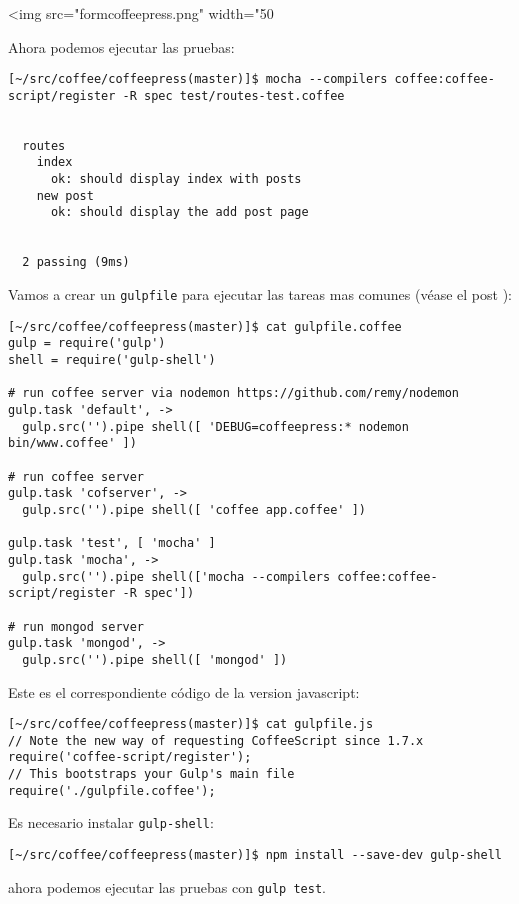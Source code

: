 \begin{rawhtml}
<img src="formcoffeepress.png" width="50%
\end{rawhtml}

Ahora podemos ejecutar las pruebas:
\begin{verbatim}
[~/src/coffee/coffeepress(master)]$ mocha --compilers coffee:coffee-script/register -R spec test/routes-test.coffee 


  routes
    index
      ok: should display index with posts 
    new post
      ok: should display the add post page 


  2 passing (9ms)
\end{verbatim}


Vamos a crear un \verb|gulpfile| para ejecutar las tareas mas comunes
(véase  el post
):
\begin{verbatim}
[~/src/coffee/coffeepress(master)]$ cat gulpfile.coffee 
gulp = require('gulp')
shell = require('gulp-shell')

# run coffee server via nodemon https://github.com/remy/nodemon
gulp.task 'default', ->
  gulp.src('').pipe shell([ 'DEBUG=coffeepress:* nodemon bin/www.coffee' ])

# run coffee server
gulp.task 'cofserver', ->
  gulp.src('').pipe shell([ 'coffee app.coffee' ])

gulp.task 'test', [ 'mocha' ]
gulp.task 'mocha', ->
  gulp.src('').pipe shell(['mocha --compilers coffee:coffee-script/register -R spec'])

# run mongod server
gulp.task 'mongod', ->
  gulp.src('').pipe shell([ 'mongod' ])
\end{verbatim}

Este es el correspondiente código de la version javascript:
\begin{verbatim}
[~/src/coffee/coffeepress(master)]$ cat gulpfile.js
// Note the new way of requesting CoffeeScript since 1.7.x
require('coffee-script/register');
// This bootstraps your Gulp's main file
require('./gulpfile.coffee');
\end{verbatim}
Es necesario instalar \verb|gulp-shell|:
\begin{verbatim}
[~/src/coffee/coffeepress(master)]$ npm install --save-dev gulp-shell 
\end{verbatim}
ahora podemos ejecutar las pruebas con \verb|gulp test|.

